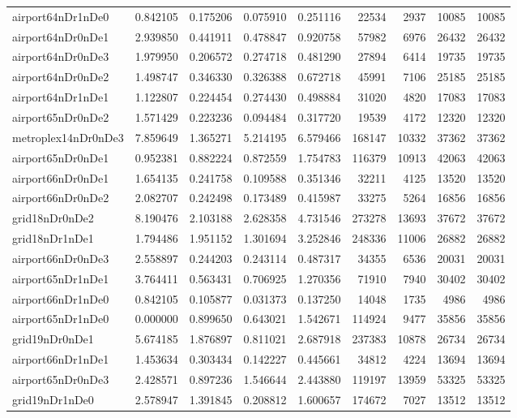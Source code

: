 \documentclass[../../../thesis.tex]{subfiles}
\begin{document}
\begin{longtable}{|l|r|r|r|r|r|r|r|r|}
airport64nDr1nDe0 & 0.842105 & 0.175206 & 0.075910 & 0.251116 & 22534 & 2937 & 10085 & 10085 \\
airport64nDr0nDe1 & 2.939850 & 0.441911 & 0.478847 & 0.920758 & 57982 & 6976 & 26432 & 26432 \\
airport64nDr0nDe3 & 1.979950 & 0.206572 & 0.274718 & 0.481290 & 27894 & 6414 & 19735 & 19735 \\
airport64nDr0nDe2 & 1.498747 & 0.346330 & 0.326388 & 0.672718 & 45991 & 7106 & 25185 & 25185 \\
airport64nDr1nDe1 & 1.122807 & 0.224454 & 0.274430 & 0.498884 & 31020 & 4820 & 17083 & 17083 \\
airport65nDr0nDe2 & 1.571429 & 0.223236 & 0.094484 & 0.317720 & 19539 & 4172 & 12320 & 12320 \\
metroplex14nDr0nDe3 & 7.859649 & 1.365271 & 5.214195 & 6.579466 & 168147 & 10332 & 37362 & 37362 \\
airport65nDr0nDe1 & 0.952381 & 0.882224 & 0.872559 & 1.754783 & 116379 & 10913 & 42063 & 42063 \\
airport66nDr0nDe1 & 1.654135 & 0.241758 & 0.109588 & 0.351346 & 32211 & 4125 & 13520 & 13520 \\
airport66nDr0nDe2 & 2.082707 & 0.242498 & 0.173489 & 0.415987 & 33275 & 5264 & 16856 & 16856 \\
grid18nDr0nDe2 & 8.190476 & 2.103188 & 2.628358 & 4.731546 & 273278 & 13693 & 37672 & 37672 \\
grid18nDr1nDe1 & 1.794486 & 1.951152 & 1.301694 & 3.252846 & 248336 & 11006 & 26882 & 26882 \\
airport66nDr0nDe3 & 2.558897 & 0.244203 & 0.243114 & 0.487317 & 34355 & 6536 & 20031 & 20031 \\
airport65nDr1nDe1 & 3.764411 & 0.563431 & 0.706925 & 1.270356 & 71910 & 7940 & 30402 & 30402 \\
airport66nDr1nDe0 & 0.842105 & 0.105877 & 0.031373 & 0.137250 & 14048 & 1735 & 4986 & 4986 \\
airport65nDr1nDe0 & 0.000000 & 0.899650 & 0.643021 & 1.542671 & 114924 & 9477 & 35856 & 35856 \\
grid19nDr0nDe1 & 5.674185 & 1.876897 & 0.811021 & 2.687918 & 237383 & 10878 & 26734 & 26734 \\
airport66nDr1nDe1 & 1.453634 & 0.303434 & 0.142227 & 0.445661 & 34812 & 4224 & 13694 & 13694 \\
airport65nDr0nDe3 & 2.428571 & 0.897236 & 1.546644 & 2.443880 & 119197 & 13959 & 53325 & 53325 \\
grid19nDr1nDe0 & 2.578947 & 1.391845 & 0.208812 & 1.600657 & 174672 & 7027 & 13512 & 13512 \\

\end{longtable}
\end{document}
